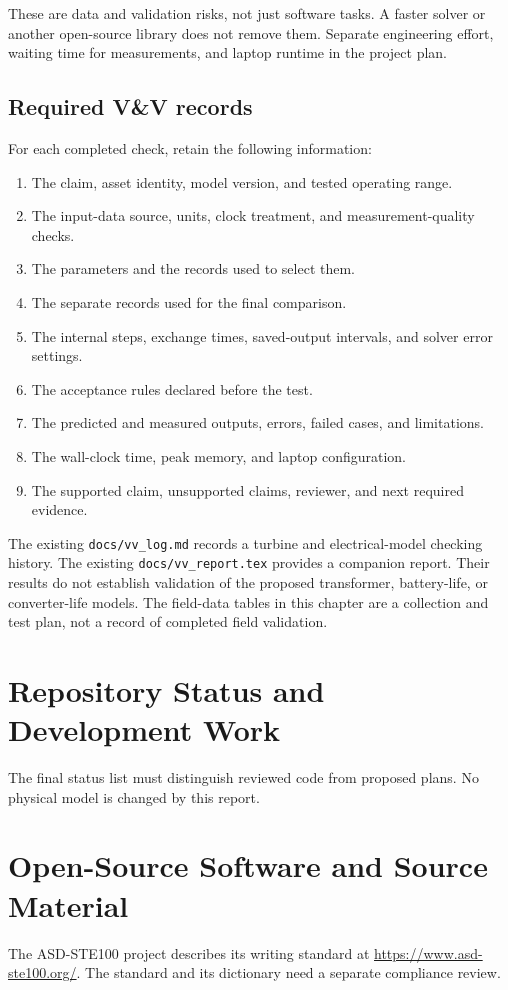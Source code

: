 \documentclass[11pt,a4paper]{report}
\newcommand{\sourcefile}[1]{\nolinkurl{#1}}
\begin{document}
These are data and validation risks, not just software tasks.
A faster solver or another open-source library does not remove them.
Separate engineering effort, waiting time for measurements, and laptop runtime in the project plan.

\section{Required V\&V records}
For each completed check, retain the following information:
\begin{enumerate}
\item The claim, asset identity, model version, and tested operating range.
\item The input-data source, units, clock treatment, and measurement-quality checks.
\item The parameters and the records used to select them.
\item The separate records used for the final comparison.
\item The internal steps, exchange times, saved-output intervals, and solver error settings.
\item The acceptance rules declared before the test.
\item The predicted and measured outputs, errors, failed cases, and limitations.
\item The wall-clock time, peak memory, and laptop configuration.
\item The supported claim, unsupported claims, reviewer, and next required evidence.
\end{enumerate}

The existing \sourcefile{docs/vv_log.md} records a turbine and electrical-model checking history.
The existing \sourcefile{docs/vv_report.tex} provides a companion report.
Their results do not establish validation of the proposed transformer, battery-life, or converter-life models.
The field-data tables in this chapter are a collection and test plan, not a record of completed field validation.

\chapter{Repository Status and Development Work}
\label{chap:status}
The final status list must distinguish reviewed code from proposed plans.
No physical model is changed by this report.

\chapter{Open-Source Software and Source Material}
\label{chap:sources}
The ASD-STE100 project describes its writing standard at
\url{https://www.asd-ste100.org/}.
The standard and its dictionary need a separate compliance review.
\end{document}
